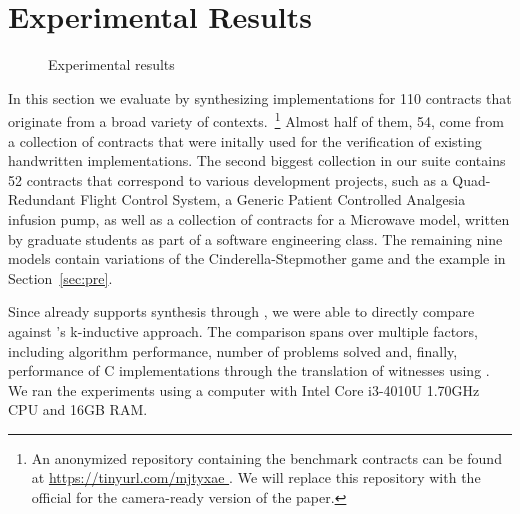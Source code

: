 \section{Experimental Results}
\label{sec:results}

\begin{figure}[!t]
\centering
{}


\caption{Experimental results}
\label{fg:results}
\end{figure}

In this section we evaluate \jsynvg by synthesizing implementations
for 110 contracts that originate from a broad variety of contexts.~\footnote{An
anonymized repository containing the benchmark contracts can be found at
\url{https://tinyurl.com/mjtyxae }. We will replace this repository with the official for the camera-ready
version of the paper.} Almost half of them, 54, come from a collection of contracts that were initally used for the verification of existing handwritten implementations. The second biggest collection in our suite contains 52 contracts that correspond to various development projects, such as a Quad-Redundant Flight Control System, a Generic Patient Controlled Analgesia infusion pump, as well as a collection of contracts
for a Microwave model, written by graduate students as part of a software
engineering class. The remaining nine models contain variations of the
Cinderella-Stepmother game and the example in Section~\ref{sec:pre}.

Since \jkind already supports synthesis through \jsyn, we were able to directly
compare \jsynvg against \jsyn's k-inductive approach.
The comparison spans over multiple factors, including
algorithm performance, number of problems solved and, finally, performance
of C implementations through the translation of witnesses using \smtlibtoc. We
ran the experiments using a computer with Intel Core i3-4010U 1.70GHz CPU and
16GB RAM.

